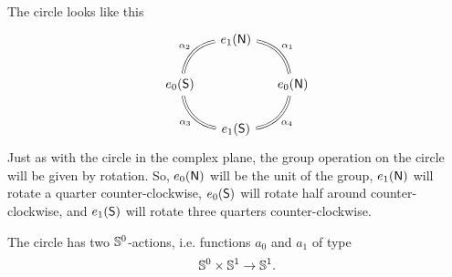 \documentclass{article}
\begin{document}
The circle looks like this
\begin{equation*}
\begin{tikzcd}[column sep=small]
& e_1(\north) \arrow[dl,bend right=35,equals,swap,"\alpha_2"] \\
e_0(\south) \arrow[dr,bend right=35,equals,swap,"\alpha_3"] & & e_0(\north) \arrow[ul,bend right=35,equals,swap,"\alpha_1"] \\
& e_1(\south) \arrow[ur,bend right=35,equals,swap,"\alpha_4"] 
\end{tikzcd}
\end{equation*}
Just as with the circle in the complex plane, the group operation on the circle
will be given by rotation. So, $e_0(\mathsf{N})$ will be the unit of the group,
$e_1(\mathsf{N})$ will rotate a quarter counter-clockwise, $e_0(\mathsf{S})$ will rotate
half around counter-clockwise, and $e_1(\mathsf{S})$ will rotate three quarters
counter-clockwise.

\begin{defn}
The circle has two $\mathbb{S}^0$-actions, i.e. functions $a_0$ and $a_1$ of type
\begin{equation*}
\mathbb{S}^0\times\mathbb{S}^1\to\mathbb{S}^1.
\end{equation*}
\end{defn}
\end{document}
